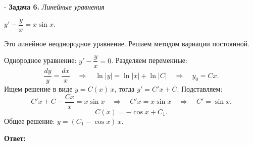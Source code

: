 \documentclass[11pt,a4paper]{article}
\makeatletter
\newcommand{\needspace}[1]{\par\penalty-100\begingroup
  \setlength{\dimen@}{#1}\dimen@ii\pagegoal\advance\dimen@ii-\pagetotal
  \ifdim\dimen@>\dimen@ii\ifdim\dimen@ii>\z@\vfil\fi\break\fi\endgroup}
\newcommand{\task}[2]{\par\needspace{10\baselineskip}\medskip\textbf{Задача #1.} \textit{#2}\par}
\newcommand{\answer}[1]{\par\smallskip\textbf{Ответ:}\quad\fbox{$\displaystyle #1$}\par}
\makeatother
\begin{document}
\task{6}{Линейные уравнения}
$y' - \dfrac{y}{x} = x \sin x$.

Это линейное неоднородное уравнение. Решаем методом вариации постоянной.

Однородное уравнение: $y' - \dfrac{y}{x} = 0$. Разделяем переменные:
\[ \frac{dy}{y} = \frac{dx}{x} \quad\Rightarrow\quad \ln|y| = \ln|x| + \ln|C| \quad\Rightarrow\quad y_0 = Cx. \]
Ищем решение в виде $y = C(x)\,x$, тогда $y' = C'x + C$. Подставляем:
\[ C'x + C - \frac{Cx}{x} = x\sin x \quad\Rightarrow\quad C'x = x\sin x \quad\Rightarrow\quad C' = \sin x. \]
\[ C(x) = -\cos x + C_1. \]
Общее решение: $y = (C_1 - \cos x)\,x$.
\answer{y = x(C - \cos x)}
\end{document}
